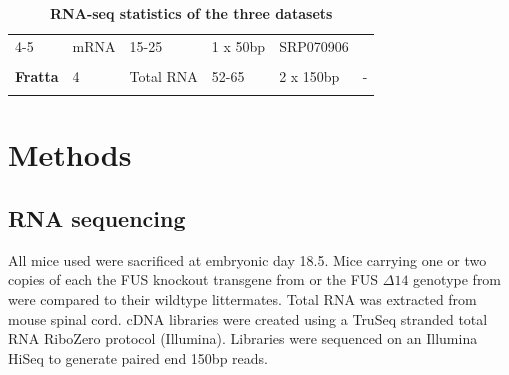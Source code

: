 \begin{longtable}[]{@{}llllll@{}}
\begin{minipage}[t]{0.14\columnwidth}
		{4-5}\strut
	\end{minipage} & \begin{minipage}[t]{0.14\columnwidth}\raggedright\strut
		{mRNA}\strut
	\end{minipage} & \begin{minipage}[t]{0.14\columnwidth}\raggedright\strut
		{15-25}\strut
	\end{minipage} & \begin{minipage}[t]{0.14\columnwidth}\raggedright\strut
		{1 x 50bp}\strut
	\end{minipage} & \begin{minipage}[t]{0.14\columnwidth}\raggedright\strut
		{SRP070906 }\strut
	\end{minipage}\tabularnewline \\
	\begin{minipage}[t]{0.14\columnwidth}\raggedright\strut
		{\textbf{Fratta} }\strut
	\end{minipage} & \begin{minipage}[t]{0.14\columnwidth}\raggedright\strut
		{4}\strut
	\end{minipage} & \begin{minipage}[t]{0.14\columnwidth}\raggedright\strut
		{Total RNA}\strut
	\end{minipage} & \begin{minipage}[t]{0.14\columnwidth}\raggedright\strut
		{52-65}\strut
	\end{minipage} & \begin{minipage}[t]{0.14\columnwidth}\raggedright\strut
		{2 x 150bp}\strut
	\end{minipage} & \begin{minipage}[t]{0.14\columnwidth}\raggedright\strut
		{-}\strut
	\end{minipage}\tabularnewline
	\caption{\textbf{RNA-seq statistics of the three datasets}}
	\label{tab:fus_sequencing}
\end{longtable}

\clearpage

\section{Methods}

\subsection{RNA sequencing}

All mice used were sacrificed at embryonic day 18.5.
Mice carrying one or two copies of each the FUS knockout transgene from \citep{Scekic-zahirovic2016} or the FUS $\Delta14$ genotype from \citep{Devoy2017} were compared to their wildtype littermates.
Total RNA was extracted from mouse spinal cord. cDNA libraries were created using a TruSeq stranded total RNA RiboZero protocol (Illumina). 
Libraries were sequenced on an Illumina HiSeq to generate paired end 150bp reads. 


